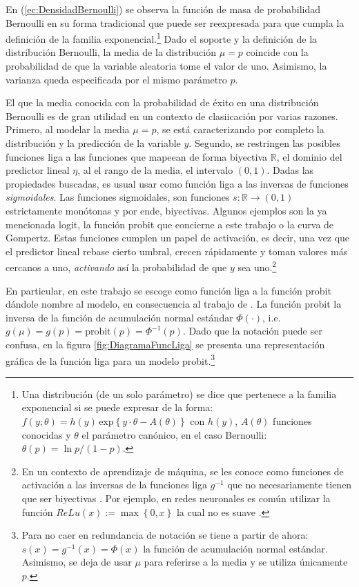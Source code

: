 \documentclass[../Main/Main.tex]{subfiles}
\begin{document}
En (\ref{ec:DensidadBernoulli}) se observa la función de masa de probabilidad Bernoulli en su forma tradicional que puede ser reexpresada para que cumpla la definición de la familia exponencial.\footnote{Una distribución (de un solo parámetro) se dice que pertenece a la familia exponencial si se puede expresar de la forma: $f(y;\theta) = h(y)\,\text{exp}\left\{y\cdot\theta - A(\theta)\right\}$ con $h(y)$, $A(\theta)$ funciones conocidas y $\theta$ el parámetro canónico, en el caso Bernoulli: $\theta(p) = \ln p/(1-p)$.} Dado el soporte y la definición de la distribución Bernoulli, la media de la distribución $\mu = p$ coincide con la probabilidad de que la variable aleatoria tome el valor de uno. Asimismo, la varianza queda especificada por el mismo parámetro $p$. 

El que la media conocida con la probabilidad de éxito en una distribución Bernoulli es de gran utilidad en un contexto de clasiicación por varias razones. Primero, al modelar la media $\mu = p$, se está caracterizando por completo la distribución y la predicción de la variable $y$. Segundo, se restringen las posibles funciones liga a las funciones que mapeean de forma biyectiva $\mathbb{R}$, el dominio del predictor lineal $\eta$, al el rango de la media, el intervalo $(0,1)$. Dadas las propiedades buscadas, es usual usar como función liga a las inversas de funciones \textit{sigmoidales}. Las funciones sigmoidales, son funciones \linebreak $s:\mathbb{R}\rightarrow (0,1)$ estrictamente monótonas y por ende, biyectivas. Algunos ejemplos son la ya mencionada logit, la función probit que concierne a este trabajo o la curva de Gompertz. Estas funciones cumplen un papel de activación, es decir, una vez que el predictor lineal rebase cierto umbral, crecen rápidamente y toman valores más cercanos a uno, \textit{activando} así la probabilidad de que $y$ sea uno.\footnote{En un contexto de aprendizaje de máquina, se les conoce como funciones de activación a las inversas de la funciones liga $g^{-1}$ que no necesariamente tienen que ser biyectivas \autocite{bishop2006pattern}. Por ejemplo, en redes neuronales es común utilizar la función $\textit{ReLu}(x):= \max\left\{0,x\right\}$ la cual no es suave \autocite{3blue1brown2017}.}

En particular, en este trabajo se escoge como función liga a la función probit dándole nombre al modelo, en consecuencia al trabajo de \citet{albert1993bayesian}. La función probit la inversa de la función de acumulación normal estándar $\Phi(\cdot)$, i.e. $g(\mu) = g(p) = \text{probit}(p) = \Phi^{-1}(p)$. Dado que la notación puede ser confusa, en la figura \ref{fig:DiagramaFuncLiga} se presenta una representación gráfica de la función liga para un modelo probit.\footnote{Para no caer en redundancia de notación se tiene a partir de ahora: $s(x) = g^{-1}(x) = \Phi(x)$ la función de acumulación normal estándar. Asimismo, se deja de usar $\mu$ para referirse a la media y se utiliza únicamente $p$.}
\end{document}
